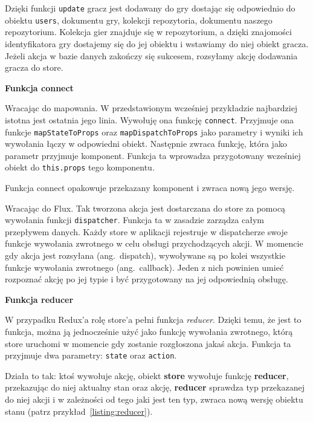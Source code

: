 Dzięki funkcji \texttt{update} gracz jest dodawany do gry dostając się odpowiednio do obiektu \texttt{users},
dokumentu gry, kolekcji repozytoria, dokumentu naszego repozytorium.
Kolekcja gier znajduje się w repozytorium, a dzięki znajomości identyfikatora gry
dostajemy się do jej obiektu i wstawiamy do niej obiekt gracza.
Jeżeli akcja w bazie danych zakończy się sukcesem, rozsyłamy akcję dodawania gracza do store.

\begin{center}
	\textbf{Funkcja connect}
\end{center}
Wracając do mapowania. W przedstawionym wcześniej przykładzie najbardziej istotna jest ostatnia jego linia.
Wywołuję ona funkcję \texttt{connect}.
Przyjmuje ona funkcje \texttt{mapStateToProps} oraz \texttt{mapDispatchToProps}
jako parametry i wyniki ich wywołania łączy w odpowiedni obiekt.
Następnie zwraca funkcję, która jako parametr przyjmuje komponent.
Funkcja ta wprowadza przygotowany wcześniej obiekt do \texttt{this.props} tego komponentu.

Funkcja connect opakowuje przekazany komponent i zwraca nową jego wersję.

Wracając do Flux. Tak tworzona akcja jest dostarczana do store za pomocą wywołania funkcji \texttt{dispatcher}.
Funkcja ta w zasadzie zarządza całym przepływem danych.
Każdy store w aplikacji rejestruje w dispatcherze swoje funkcje wywołania zwrotnego
w celu obsługi przychodzących akcji.
W momencie gdy akcja jest rozsyłana (ang.\ dispatch), wywoływane są po kolei wszystkie
funkcje wywołania zwrotnego (ang.\ callback).
Jeden z nich powinien umieć rozpoznać akcję po jej typie i być przygotowany na jej odpowiednią obsługę.

\begin{center}
	\textbf{Funkcja reducer}
\end{center}

W przypadku Redux'a rolę store'a pełni funkcja \textit{reducer}. Dzięki temu, że jest to funkcja,
można ją jednocześnie użyć jako funkcję wywołania zwrotnego,
którą store uruchomi w momencie gdy zostanie rozgłoszona jakaś akcja.
Funkcja ta przyjmuje dwa parametry: \texttt{state} oraz \texttt{action}.

Działa to tak: ktoś wywołuje akcję, obiekt \textbf{store} wywołuje funkcję \textbf{reducer},
przekazując do niej aktualny stan oraz akcję, \textbf{reducer}
sprawdza typ przekazanej do niej akcji i w zależności od tego jaki jest ten typ,
zwraca nową wersję obiektu stanu (patrz przykład~\ref{listing:reducer}).

